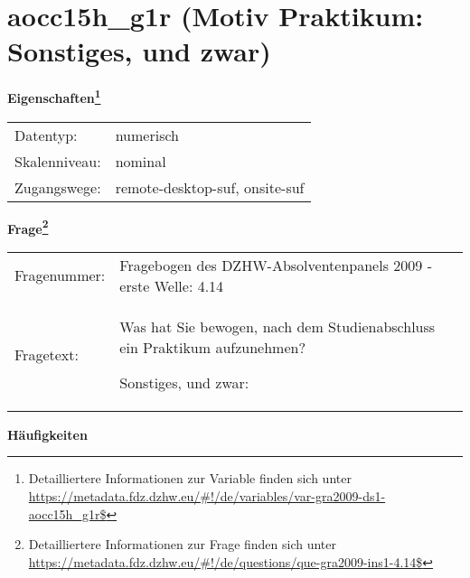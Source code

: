 
    \setcounter{footnote}{0}

    \vspace*{-1.8cm}
	\section{aocc15h\_g1r (Motiv Praktikum: Sonstiges, und zwar)}
	\label{section:aocc15h_g1r}



    \vspace*{0.5cm}
    \noindent\textbf{Eigenschaften\footnote{Detailliertere Informationen zur Variable finden sich unter
		\url{https://metadata.fdz.dzhw.eu/\#!/de/variables/var-gra2009-ds1-aocc15h_g1r$}}}\\
	\begin{tabularx}{\hsize}{@{}lX}
	Datentyp: & numerisch \\
	Skalenniveau: & nominal \\
	Zugangswege: &
	  remote-desktop-suf, 
	  onsite-suf
 \\
    \end{tabularx}



				\vspace*{0.5cm}
                \noindent\textbf{Frage\footnote{Detailliertere Informationen zur Frage finden sich unter
		              \url{https://metadata.fdz.dzhw.eu/\#!/de/questions/que-gra2009-ins1-4.14$}}}\\
				\begin{tabularx}{\hsize}{@{}lX}
					Fragenummer: &
					  Fragebogen des DZHW-Absolventenpanels 2009 - erste Welle:
					  4.14
 \\
					Fragetext: & Was hat Sie bewogen, nach dem Studienabschluss ein Praktikum aufzunehmen?\par  Sonstiges, und zwar: \\
				\end{tabularx}





        		\vspace*{0.5cm}
                \noindent\textbf{Häufigkeiten}

